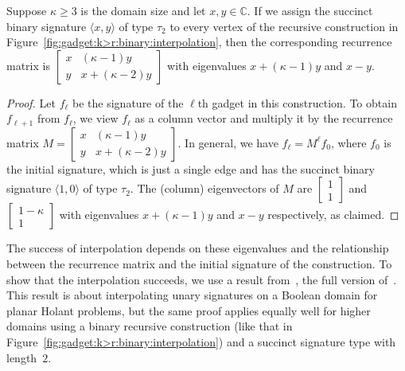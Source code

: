 \documentclass[11pt]{article}
\begin{document}
\begin{lemma} \label{lem:k>r:binary:interpolation:eigenvalues}
 Suppose $\kappa \ge 3$ is the domain size and let $x,y \in \mathbb{C}$.
 If we assign the succinct binary signature $\langle x,y \rangle$ of type $\tau_2$
 to every vertex of the recursive construction in Figure~\ref{fig:gadget:k>r:binary:interpolation},
 then the corresponding recurrence matrix is $\left[\begin{smallmatrix} x & (\kappa - 1) y \\ y & x + (\kappa - 2) y \end{smallmatrix}\right]$
 with eigenvalues $x + (\kappa - 1) y$ and $x - y$.
\end{lemma}

\begin{proof}
 Let $f_\ell$ be the signature of the $\ell$th gadget in this construction.
 To obtain $f_{\ell+1}$ from $f_\ell$,
 we view $f_\ell$ as a column vector and multiply it by the recurrence matrix $M = \left[\begin{smallmatrix} x & (\kappa - 1) y \\ y & x + (\kappa - 2) y \end{smallmatrix}\right]$.
 In general, we have $f_\ell = M^\ell f_0$,
 where $f_0$ is the initial signature,
 which is just a single edge and has the succinct binary signature $\langle 1,0 \rangle$ of type $\tau_2$.
 The (column) eigenvectors of $M$ are $\left[\begin{smallmatrix} 1 \\ 1 \end{smallmatrix}\right]$
 and $\left[\begin{smallmatrix} 1 - \kappa \\ 1 \end{smallmatrix}\right]$ with eigenvalues $x + (\kappa - 1) y$ and $x - y$ respectively,
 as claimed.
\end{proof}

The success of interpolation depends on these eigenvalues and the relationship between the recurrence matrix and the initial signature of the construction.
To show that the interpolation succeeds,
we use a result from~\cite{GW12},
the full version of~\cite{GW13}.
This result is about interpolating unary signatures on a Boolean domain for planar Holant problems,
but the same proof applies equally well for higher domains using a binary recursive construction (like that in Figure~\ref{fig:gadget:k>r:binary:interpolation})
and a succinct signature type with length~$2$.
\end{document}
